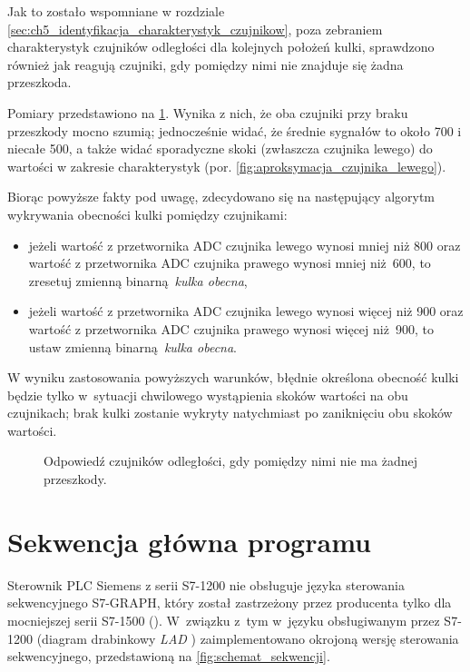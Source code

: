 Jak to zostało wspomniane w rozdziale \ref{sec:ch5_identyfikacja_charakterystyk_czujnikow}, poza zebraniem charakterystyk czujników odległości dla kolejnych położeń kulki, sprawdzono również jak reagują czujniki, gdy pomiędzy nimi nie znajduje się żadna przeszkoda.

Pomiary przedstawiono na \cref{fig:czujniki_charakterystyka_bez_przeszkody}. Wynika z nich, że oba czujniki przy braku przeszkody mocno szumią; jednocześnie widać, że średnie sygnałów to około \num{700} i niecałe \num{500}, a także widać sporadyczne skoki (zwłaszcza czujnika lewego) do wartości w zakresie charakterystyk (por. \cref{fig:aproksymacja_czujnika_lewego}).

Biorąc powyższe fakty pod uwagę, zdecydowano się na następujący algorytm wykrywania obecności kulki pomiędzy czujnikami:
\begin{itemize}
    \item jeżeli wartość z przetwornika ADC czujnika lewego wynosi mniej niż \num{800} oraz wartość z przetwornika ADC czujnika prawego wynosi mniej niż \num{600}, to zresetuj zmienną binarną \textit{kulka obecna},
    \item jeżeli wartość z przetwornika ADC czujnika lewego wynosi więcej niż \num{900} oraz wartość z przetwornika ADC czujnika prawego wynosi więcej niż \num{900}, to ustaw zmienną binarną \textit{kulka obecna}.
\end{itemize}

W wyniku zastosowania powyższych warunków, błędnie określona obecność kulki będzie tylko w~sytuacji chwilowego wystąpienia skoków wartości na obu czujnikach; brak kulki zostanie wykryty natychmiast po zaniknięciu obu skoków wartości.

\begin{figure}[ht]
    \centering
        
    \caption{Odpowiedź czujników odległości, gdy pomiędzy nimi nie ma żadnej przeszkody.}
    \label{fig:czujniki_charakterystyka_bez_przeszkody}
\end{figure}

\section{Sekwencja główna programu}
\label{sec:sekwencja_glowna}

Sterownik PLC Siemens z serii S7-1200 nie obsługuje języka sterowania sekwencyjnego \textsc{S7-GRAPH}, który został zastrzeżony przez producenta tylko dla mocniejszej serii S7-1500 (\cite{SCL_S71200_S71500}). W~związku z~tym w~języku obsługiwanym przez S7-1200 (diagram drabinkowy \textit{LAD} \cite{PROGRAMOWANIE_PLC}) zaimplementowano okrojoną wersję sterowania sekwencyjnego, przedstawioną na \cref{fig:schemat_sekwencji}.


